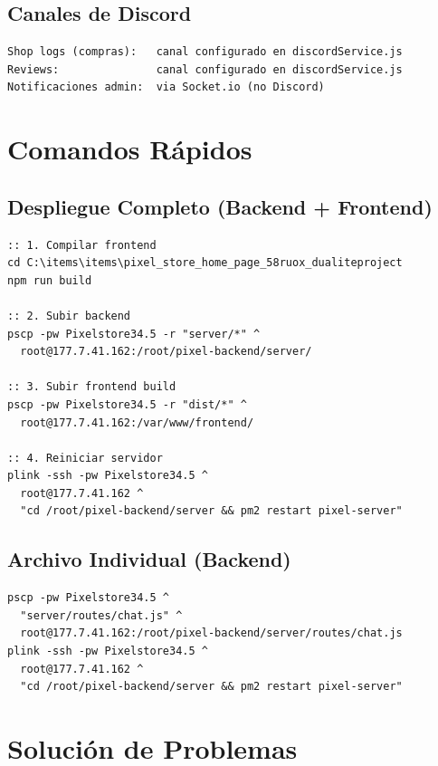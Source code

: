 \documentclass[12pt,a4paper]{article}
\begin{document}
\subsection{Canales de Discord}

\begin{lstlisting}
Shop logs (compras):   canal configurado en discordService.js
Reviews:               canal configurado en discordService.js
Notificaciones admin:  via Socket.io (no Discord)
\end{lstlisting}

\newpage

\section{Comandos Rápidos}

\subsection{Despliegue Completo (Backend + Frontend)}

\begin{lstlisting}
:: 1. Compilar frontend
cd C:\items\items\pixel_store_home_page_58ruox_dualiteproject
npm run build

:: 2. Subir backend
pscp -pw Pixelstore34.5 -r "server/*" ^
  root@177.7.41.162:/root/pixel-backend/server/

:: 3. Subir frontend build
pscp -pw Pixelstore34.5 -r "dist/*" ^
  root@177.7.41.162:/var/www/frontend/

:: 4. Reiniciar servidor
plink -ssh -pw Pixelstore34.5 ^
  root@177.7.41.162 ^
  "cd /root/pixel-backend/server && pm2 restart pixel-server"
\end{lstlisting}

\subsection{Archivo Individual (Backend)}

\begin{lstlisting}
pscp -pw Pixelstore34.5 ^
  "server/routes/chat.js" ^
  root@177.7.41.162:/root/pixel-backend/server/routes/chat.js
plink -ssh -pw Pixelstore34.5 ^
  root@177.7.41.162 ^
  "cd /root/pixel-backend/server && pm2 restart pixel-server"
\end{lstlisting}

\newpage

\section{Solución de Problemas}
\end{document}
